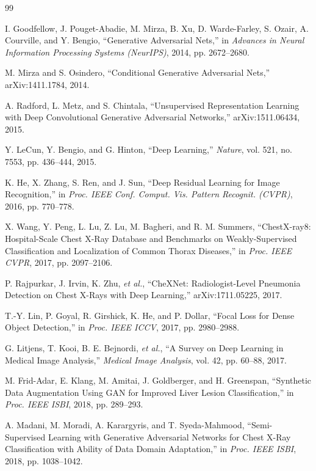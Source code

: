 \documentclass[conference]{IEEEtran}
\begin{document}
\begin{thebibliography}{99}

I. Goodfellow, J. Pouget-Abadie, M. Mirza, B. Xu, D. Warde-Farley, S. Ozair, A. Courville, and Y. Bengio, ``Generative Adversarial Nets,'' in \textit{Advances in Neural Information Processing Systems (NeurIPS)}, 2014, pp. 2672--2680.

M. Mirza and S. Osindero, ``Conditional Generative Adversarial Nets,'' arXiv:1411.1784, 2014.

A. Radford, L. Metz, and S. Chintala, ``Unsupervised Representation Learning with Deep Convolutional Generative Adversarial Networks,'' arXiv:1511.06434, 2015.

Y. LeCun, Y. Bengio, and G. Hinton, ``Deep Learning,'' \textit{Nature}, vol. 521, no. 7553, pp. 436--444, 2015.

K. He, X. Zhang, S. Ren, and J. Sun, ``Deep Residual Learning for Image Recognition,'' in \textit{Proc. IEEE Conf. Comput. Vis. Pattern Recognit. (CVPR)}, 2016, pp. 770--778.

X. Wang, Y. Peng, L. Lu, Z. Lu, M. Bagheri, and R. M. Summers, ``ChestX-ray8: Hospital-Scale Chest X-Ray Database and Benchmarks on Weakly-Supervised Classification and Localization of Common Thorax Diseases,'' in \textit{Proc. IEEE CVPR}, 2017, pp. 2097--2106.

P. Rajpurkar, J. Irvin, K. Zhu, \textit{et al.}, ``CheXNet: Radiologist-Level Pneumonia Detection on Chest X-Rays with Deep Learning,'' arXiv:1711.05225, 2017.

T.-Y. Lin, P. Goyal, R. Girshick, K. He, and P. Dollar, ``Focal Loss for Dense Object Detection,'' in \textit{Proc. IEEE ICCV}, 2017, pp. 2980--2988.

G. Litjens, T. Kooi, B. E. Bejnordi, \textit{et al.}, ``A Survey on Deep Learning in Medical Image Analysis,'' \textit{Medical Image Analysis}, vol. 42, pp. 60--88, 2017.

M. Frid-Adar, E. Klang, M. Amitai, J. Goldberger, and H. Greenspan, ``Synthetic Data Augmentation Using GAN for Improved Liver Lesion Classification,'' in \textit{Proc. IEEE ISBI}, 2018, pp. 289--293.

A. Madani, M. Moradi, A. Karargyris, and T. Syeda-Mahmood, ``Semi-Supervised Learning with Generative Adversarial Networks for Chest X-Ray Classification with Ability of Data Domain Adaptation,'' in \textit{Proc. IEEE ISBI}, 2018, pp. 1038--1042.


\end{thebibliography}
\end{document}
